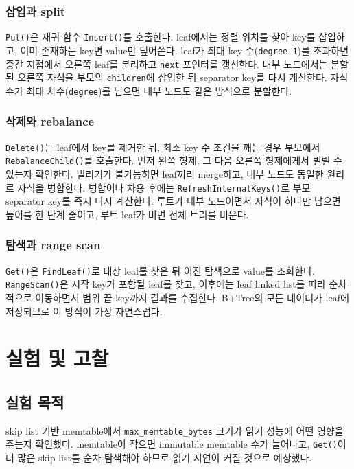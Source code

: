 \documentclass[11pt,a4paper]{article}
\begin{document}
\subsubsection{삽입과 split}
\texttt{Put()}은 재귀 함수 \texttt{Insert()}를 호출한다. leaf에서는 정렬 위치를 찾아 key를 삽입하고, 이미 존재하는 key면 value만 덮어쓴다. leaf가 최대 key 수(\texttt{degree-1})를 초과하면 중간 지점에서 오른쪽 leaf를 분리하고 \texttt{next} 포인터를 갱신한다. 내부 노드에서는 분할된 오른쪽 자식을 부모의 \texttt{children}에 삽입한 뒤 separator key를 다시 계산한다. 자식 수가 최대 차수(\texttt{degree})를 넘으면 내부 노드도 같은 방식으로 분할한다.

\subsubsection{삭제와 rebalance}
\texttt{Delete()}는 leaf에서 key를 제거한 뒤, 최소 key 수 조건을 깨는 경우 부모에서 \texttt{RebalanceChild()}를 호출한다. 먼저 왼쪽 형제, 그 다음 오른쪽 형제에게서 빌릴 수 있는지 확인한다. 빌리기가 불가능하면 leaf끼리 merge하고, 내부 노드도 동일한 원리로 자식을 병합한다. 병합이나 차용 후에는 \texttt{RefreshInternalKeys()}로 부모 separator key를 즉시 다시 계산한다. 루트가 내부 노드이면서 자식이 하나만 남으면 높이를 한 단계 줄이고, 루트 leaf가 비면 전체 트리를 비운다.

\subsubsection{탐색과 range scan}
\texttt{Get()}은 \texttt{FindLeaf()}로 대상 leaf를 찾은 뒤 이진 탐색으로 value를 조회한다. \texttt{RangeScan()}은 시작 key가 포함될 leaf를 찾고, 이후에는 leaf linked list를 따라 순차적으로 이동하면서 범위 끝 key까지 결과를 수집한다. B+Tree의 모든 데이터가 leaf에 저장되므로 이 방식이 가장 자연스럽다.

\section{실험 및 고찰}
\subsection{실험 목적}
skip list 기반 memtable에서 \texttt{max\_memtable\_bytes} 크기가 읽기 성능에 어떤 영향을 주는지 확인했다. memtable이 작으면 immutable memtable 수가 늘어나고, \texttt{Get()}이 더 많은 skip list를 순차 탐색해야 하므로 읽기 지연이 커질 것으로 예상했다.
\end{document}
